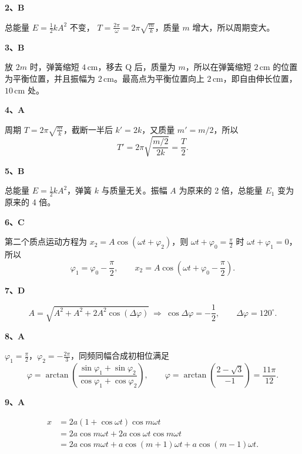 \documentclass[UTF8,zihao=5,fontset=none,a4paper]{ctexart}
\newcounter{question}
\newcommand{\ans}[2]{\par\Needspace{4\baselineskip}\textbf{#1、#2}\par}
\newenvironment{questionblock}{\par\addvspace{5pt}\noindent
  \begin{minipage}{\linewidth}\setlength{\parskip}{4pt}}
  {\end{minipage}\par\addvspace{5pt}}
\begin{document}
\begin{questionblock}
\ans{2}{B}
总能量 $E=\frac12kA^2$ 不变，
$T=\frac{2\pi}{\omega}=2\pi\sqrt{\frac mk}$，质量 $m$ 增大，所以周期变大。
\end{questionblock}
\begin{questionblock}
\ans{3}{B}
放 $2m$ 时，弹簧缩短 $4\,\mathrm{cm}$，移去 Q 后，质量为 $m$，所以在弹簧缩短 $2\,\mathrm{cm}$ 的位置为平衡位置，并且振幅为 $2\,\mathrm{cm}$。最高点为平衡位置向上 $2\,\mathrm{cm}$，即自由伸长位置，$10\,\mathrm{cm}$ 处。
\end{questionblock}
\begin{questionblock}
\ans{4}{A}
周期 $T=2\pi\sqrt{\frac mk}$，截断一半后 $k'=2k$，又质量 $m'=m/2$，所以
\[
T'=2\pi\sqrt{\frac{m/2}{2k}}=\frac T2.
\]
\end{questionblock}
\begin{questionblock}
\ans{5}{B}
总能量 $E=\frac12kA^2$，弹簧 $k$ 与质量无关。振幅 $A$ 为原来的 2 倍，总能量 $E_1$ 变为原来的 4 倍。
\end{questionblock}
\begin{questionblock}
\ans{6}{C}
第二个质点运动方程为 $x_2=A\cos(\omega t+\varphi_2)$，则 $\omega t+\varphi_0=\frac\pi2$ 时 $\omega t+\varphi_1=0$，所以
\[
\varphi_1=\varphi_0-\frac\pi2,\qquad
x_2=A\cos\left(\omega t+\varphi_0-\frac\pi2\right).
\]
\end{questionblock}
\begin{questionblock}
\ans{7}{D}

\[
A=\sqrt{A^2+A^2+2A^2\cos(\Delta\varphi)}
\ \Rightarrow\ \cos\Delta\varphi=-\frac12,\qquad \Delta\varphi=120^\circ.
\]
\end{questionblock}
\begin{questionblock}
\ans{8}{A}
$\varphi_1=\frac\pi2$，$\varphi_2=-\frac{2\pi}3$，同频同幅合成初相位满足
\[
\varphi=\arctan\left(\frac{\sin\varphi_1+\sin\varphi_2}
{\cos\varphi_1+\cos\varphi_2}\right),
\qquad
\varphi=\arctan\left(\frac{2-\sqrt3}{-1}\right)=\frac{11\pi}{12}.
\]
\end{questionblock}
\begin{questionblock}
\ans{9}{A}

\[
\begin{aligned}
x&=2a(1+\cos\omega t)\cos m\omega t\\
 &=2a\cos m\omega t+2a\cos\omega t\cos m\omega t\\
 &=2a\cos m\omega t+a\cos(m+1)\omega t+a\cos(m-1)\omega t.
\end{aligned}
\]
\end{questionblock}
\end{document}
